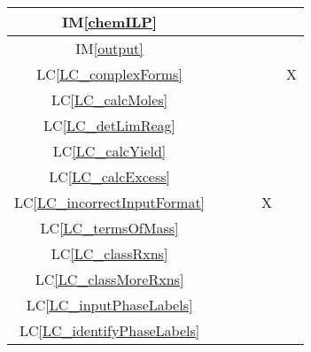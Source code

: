 \documentclass[12pt]{article}
\newcommand{\imref}[1]{IM\ref{#1}}
\newcommand{\lcref}[1]{LC\ref{#1}}
\begin{document}
\begin{table}[h!]
{\begin{tabular}{|c|c|c|c|c|c|}
      \imref{chemILP}                 &                       &                     &                    &                             &                      \\ \hline
      \imref{output}                  &                       &                     &                    &                             &                      \\ \hline
      \lcref{LC_complexForms}         &                       &                     &                    &                             & X                    \\ \hline
      \lcref{LC_calcMoles}            &                       &                     &                    &                             &                      \\ \hline
      \lcref{LC_detLimReag}           &                       &                     &                    &                             &                      \\ \hline
      \lcref{LC_calcYield}            &                       &                     &                    &                             &                      \\ \hline
      \lcref{LC_calcExcess}           &                       &                     &                    &                             &                      \\ \hline
      \lcref{LC_incorrectInputFormat} &                       &                     &                    & X                           &                      \\ \hline
      \lcref{LC_termsOfMass}          &                       &                     &                    &                             &                      \\ \hline
      \lcref{LC_classRxns}            &                       &                     &                    &                             &                      \\ \hline
      \lcref{LC_classMoreRxns}        &                       &                     &                    &                             &                      \\ \hline
      \lcref{LC_inputPhaseLabels}     &                       &                     &                    &                             &                      \\ \hline
      \lcref{LC_identifyPhaseLabels}  &                       &                     &                    &                             &                      \\ \hline

\end{tabular}}
\end{table}
\end{document}
